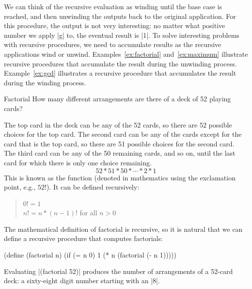 \begin{schemeregion}
We can think of the recursive evaluation as winding until the base case is reached, and then unwinding the outputs back to the original application.  For this procedure, the output is not very interesting: no matter what positive number we apply \scheme|g| to, the eventual result is \schemeresult|1|.  To solve interesting problems with recursive procedures, we need to accumulate results as the recursive applications wind or unwind.  Examples~\ref{ex:factorial} and~\ref{ex:maximum} illustrate recursive procedures that accumulate the result during the unwinding process.  Example~\ref{ex:gcd} illustrates a recursive procedure that accumulates the result during the winding process.

\begin{example}{Factorial}\label{ex:factorial}
How many different arrangements are there of a deck of 52 playing cards?  

The top card in the deck can be any of the 52 cards, so there are 52 possible choices for the top card.   
The second card can be any of the cards except for the card that is the top card, so there are 51 possible choices for the second card.  The third card can be any of the 50 remaining cards, and so on, until the last card for which there is only one choice remaining.  
\begin{displaymath}
52 * 51 * 50 * \cdots * 2 * 1
\end{displaymath}
This is known as the  function (denoted in mathematics using the exclamation point, e.g., $52!$).  It can be defined recursively:
\begin{quote}
$0! = 1$\\
$n! = n * (n - 1)!$ for all $n > 0$
\end{quote}
The mathematical definition of factorial is recursive, so it is natural that we can define a recursive procedure that computes factorials:
\begin{schemedisplay}
(define (factorial n)
  (if (= n 0) 
     1
     (* n (factorial (- n 1)))))
\end{schemedisplay}

Evaluating \scheme|(factorial 52)| produces the number of arrangements of a 52-card deck: a sixty-eight digit number starting with an \scheme|8|.


\end{example}
\end{schemeregion}
